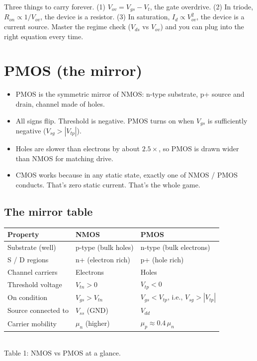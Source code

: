 \documentclass[11pt]{article}
\begin{document}
\begin{checkpoint}
Three things to carry forever. (1) $V_{ov} = V_{gs} - V_t$, the gate overdrive. (2) In triode, $R_{on} \propto 1/V_{ov}$, the device is a resistor. (3) In saturation, $I_d \propto V_{ov}^2$, the device is a current source. Master the regime check ($V_{ds}$ vs $V_{ov}$) and you can plug into the right equation every time.
\end{checkpoint}

\section{PMOS (the mirror)}

\begin{tldr}
\begin{itemize}[leftmargin=*]
\item PMOS is the symmetric mirror of NMOS: n-type substrate, p+ source and drain, channel made of holes.
\item All signs flip. Threshold is negative. PMOS turns on when $V_{gs}$ is sufficiently negative ($V_{sg} > |V_{tp}|$).
\item Holes are slower than electrons by about $2.5\times$, so PMOS is drawn wider than NMOS for matching drive.
\item CMOS works because in any static state, exactly one of NMOS / PMOS conducts. That's zero static current. That's the whole game.
\end{itemize}
\end{tldr}

\subsection{The mirror table}

\begin{center}
\begin{tabular}{lll}
\toprule
Property & NMOS & PMOS \\
\midrule
Substrate (well) & p-type (bulk holes) & n-type (bulk electrons) \\
S / D regions & n+ (electron rich) & p+ (hole rich) \\
Channel carriers & Electrons & Holes \\
Threshold voltage & $V_{tn} > 0$ & $V_{tp} < 0$ \\
On condition & $V_{gs} > V_{tn}$ & $V_{gs} < V_{tp}$, i.e., $V_{sg} > |V_{tp}|$ \\
Source connected to & $V_{ss}$ (GND) & $V_{dd}$ \\
Carrier mobility & $\mu_n$ (higher) & $\mu_p \approx 0.4\,\mu_n$ \\
\bottomrule
\end{tabular}
\\
{\small Table 1: NMOS vs PMOS at a glance.}
\end{center}
\end{document}
